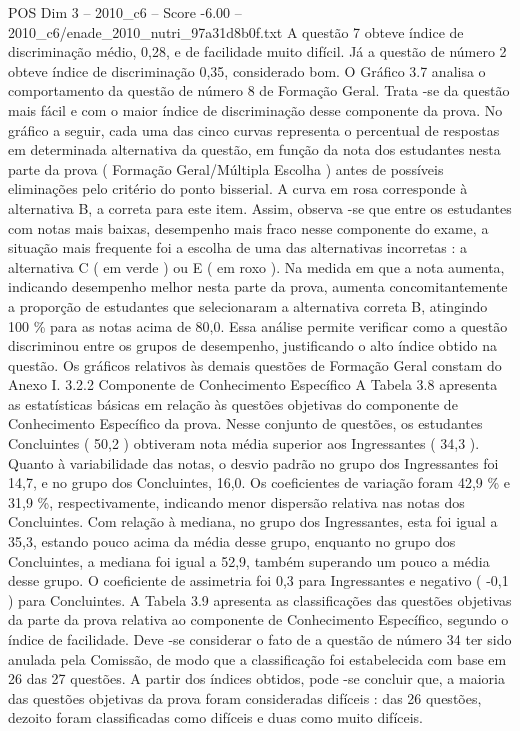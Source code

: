 \begin{textsample}{POS Dim 3 – 2010\_c6 – Score -6.00 – 2010\_c6/enade\_2010\_nutri\_97a31d8b0f.txt}
A questão 7 obteve índice de discriminação médio, 0,28, e de facilidade muito difícil.
Já a questão de número 2 obteve índice de discriminação 0,35, considerado bom.
O Gráfico 3.7 analisa o comportamento da questão de número 8 de Formação Geral.
Trata -se da questão mais fácil e com o maior índice de discriminação desse componente da prova.
No gráfico a seguir, cada uma das cinco curvas representa o percentual de respostas em determinada alternativa da questão, em função da nota dos estudantes nesta parte da prova ( Formação Geral/Múltipla Escolha ) antes de possíveis eliminações pelo critério do ponto bisserial.
A curva em rosa corresponde à alternativa B, a correta para este item.
Assim, observa -se que entre os estudantes com notas mais baixas, desempenho mais fraco nesse componente do exame, a situação mais frequente foi a escolha de uma das alternativas incorretas : a alternativa C ( em verde ) ou E ( em roxo ).
Na medida em que a nota aumenta, indicando desempenho melhor nesta parte da prova, aumenta concomitantemente a proporção de estudantes que selecionaram a alternativa correta B, atingindo 100 \% para as notas acima de 80,0.
Essa análise permite verificar como a questão discriminou entre os grupos de desempenho, justificando o alto índice obtido na questão.
Os gráficos relativos às demais questões de Formação Geral constam do Anexo I. 3.2.2 Componente de Conhecimento Específico A Tabela 3.8 apresenta as estatísticas básicas em relação às questões objetivas do componente de Conhecimento Específico da prova.
Nesse conjunto de questões, os estudantes Concluintes ( 50,2 ) obtiveram nota média superior aos Ingressantes ( 34,3 ).
Quanto à variabilidade das notas, o desvio padrão no grupo dos Ingressantes foi 14,7, e no grupo dos Concluintes, 16,0.
Os coeficientes de variação foram 42,9 \% e 31,9 \%, respectivamente, indicando menor dispersão relativa nas notas dos Concluintes.
Com relação à mediana, no grupo dos Ingressantes, esta foi igual a 35,3, estando pouco acima da média desse grupo, enquanto no grupo dos Concluintes, a mediana foi igual a 52,9, também superando um pouco a média desse grupo.
O coeficiente de assimetria foi 0,3 para Ingressantes e negativo ( -0,1 ) para Concluintes.
A Tabela 3.9 apresenta as classificações das questões objetivas da parte da prova relativa ao componente de Conhecimento Específico, segundo o índice de facilidade.
Deve -se considerar o fato de a questão de número 34 ter sido anulada pela Comissão, de modo que a classificação foi estabelecida com base em 26 das 27 questões.
A partir dos índices obtidos, pode -se concluir que, a maioria das questões objetivas da prova foram consideradas difíceis : das 26 questões, dezoito foram classificadas como difíceis e duas como muito difíceis.

\end{textsample}
